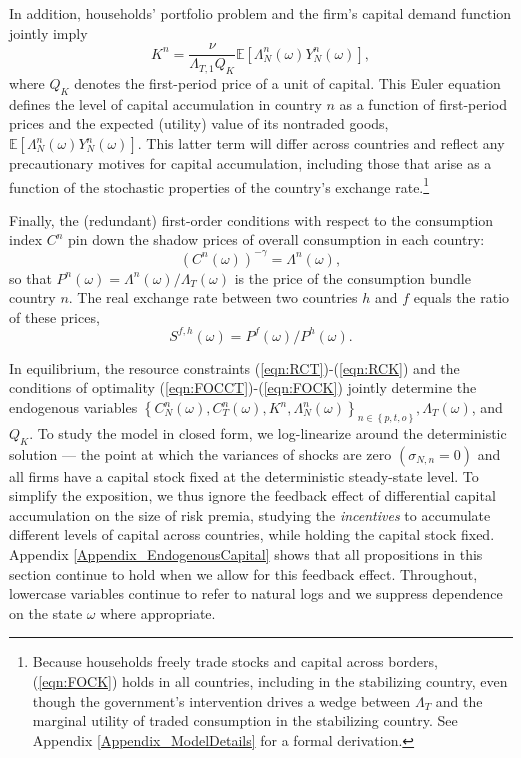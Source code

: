 \documentclass[12pt,letter]{article}
\theoremstyle{break} \theorembodyfont{\normalfont\itshape}
\theoremstyle{break}
\theoremstyle{break} \theorembodyfont{\normalfont\itshape}
\theoremstyle{break} \theorembodyfont{\normalfont\itshape}
\begin{document}
In addition, households' portfolio problem and the firm's capital
demand function jointly imply \begin{equation} K^n =
  \frac{\nu}{\Lambda_{T, 1} Q_K} \mathbb{E}\left[ \Lambda_N^n(\omega)
    Y_N^n(\omega) \right]
  \label{eqn:FOCK}
  ,\end{equation} 
where \(Q_{K}\) denotes the first-period price of a unit of capital. This Euler equation defines the level of capital accumulation in country 
$n$ as a function of first-period prices and the expected (utility) value of its 
nontraded goods, \(\mathbb{E}\left[ \Lambda_N^n(\omega) Y_N^n(\omega) \right]\). 
This latter term will differ across countries and reflect any precautionary 
motives for capital accumulation, including those that arise as a function of 
the stochastic properties of the country's exchange rate.\footnote{Because households freely trade stocks and capital across borders, (\ref{eqn:FOCK}) holds in all countries,
  including in the stabilizing country, even though the
  government's intervention drives a wedge between \(\Lambda_T\) and the marginal utility of traded consumption in the stabilizing country. See
  Appendix \ref{Appendix_ModelDetails} for a formal derivation.}


Finally, the (redundant) first-order conditions with respect to the
consumption index $C^n$ pin down the shadow prices of overall
consumption in each country:
\begin{equation}
  \left( C^n(\omega) \right)^{- \gamma} = \Lambda^n(\omega),
  \label{eqn:lambda}
\end{equation} so that \(P^{n}(\omega)=\Lambda^n(\omega)/\Lambda_T(\omega)\) is the price of the consumption bundle country \(n\).
The real exchange rate between two countries $h$ and $f$ equals the
ratio of these prices,
\begin{equation*}
  S^{f, h}(\omega) = P^f(\omega) / P^h(\omega).
\end{equation*}


In equilibrium, the resource constraints
(\ref{eqn:RCT})-(\ref{eqn:RCK}) and the conditions of optimality
(\ref{eqn:FOCCT})-(\ref{eqn:FOCK}) jointly determine the endogenous
variables
$\left\{ C_{N}^n(\omega), C_{T}^n(\omega), K^n, \Lambda_{N}^n(\omega)
\right\}_{n \in \left\{ p, t, o \right\}}, \Lambda_{T}(\omega)$, and
$Q_K$. To study the model in closed form, we log-linearize around the
deterministic solution --- the point at which the variances of shocks
are zero $\left( \sigma_{N, n} = 0 \right)$ and all firms have a
capital stock fixed at the deterministic steady-state level. To
simplify the exposition, we thus ignore the feedback effect of
differential capital accumulation on the size of risk premia, studying
the \textit{incentives} to accumulate different levels of capital
across countries, while holding the capital stock fixed. Appendix
\ref{Appendix_EndogenousCapital} shows that all propositions in this
section continue to hold when we allow for this feedback effect.
Throughout, lowercase variables continue to refer to natural logs and
we suppress dependence on the state $\omega$ where appropriate.
\end{document}
